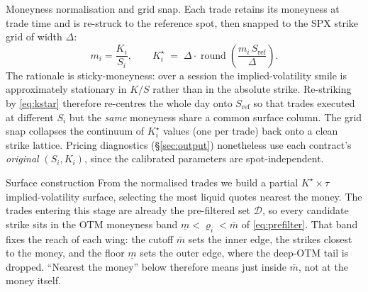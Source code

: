 \documentclass[a4paper, 11pt, reqno]{amsart}
\makeatletter
\def\section{\@startsection{section}{1}%
	\z@{.7\linespacing\@plus\linespacing}{.5\linespacing}%
	{\normalfont\bfseries\centering}}
\def\paragraph{\@startsection{paragraph}{4}%
	\z@\z@{-\fontdimen2\font}%
	{\normalfont\bfseries}}
\DeclareMathOperator{\round}{round}
\newcommand{\ConstOtmFloorSym}{\underline{m}}            \newcommand{\ConstOtmFloorVal}{0.6}
\newcommand{\ConstOtmCutoffSym}{\bar m}                  \newcommand{\ConstOtmCutoffVal}{0.98}
\newcommand{\ConstStrikeGridSym}{\Delta}                 \newcommand{\ConstStrikeGridVal}{5.0}
\makeatother
\begin{document}
		\paragraph{Moneyness normalisation and grid snap.} Each trade retains its moneyness at
		trade time and is re-struck to the reference spot, then snapped to the SPX strike grid of
		width $\ConstStrikeGridSym$:
		\begin{equation}\label{eq:kstar}
			m_i = \frac{K_i}{S_i},
			\qquad
			K^\star_i \;=\; \ConstStrikeGridSym \cdot \round\!\left( \frac{m_i\, S_{\mathrm{ref}}}{\ConstStrikeGridSym} \right).
		\end{equation}
		The rationale is sticky-moneyness: over a session the implied-volatility smile is
		approximately stationary in $K/S$ rather than in the absolute strike. Re-striking by
		\eqref{eq:kstar} therefore re-centres the whole day onto $S_{\mathrm{ref}}$ so that trades
		executed at different $S_i$ but the \emph{same} moneyness share a common surface column.
		The grid snap collapses the continuum of $K^\star_i$ values (one per trade) back onto a
		clean strike lattice. Pricing diagnostics (\S\ref{sec:output}) nonetheless use each
		contract's \emph{original} $(S_i,K_i)$, since the calibrated parameters are spot-independent.
		
	\section{Surface construction}\label{sec:surface}
		From the normalised trades we build a partial $K^\star \times \tau$ implied-volatility
		surface, selecting the most liquid quotes nearest the money. The trades entering this stage
		are already the pre-filtered set $\mathcal{D}$, so every candidate strike sits in the OTM
		moneyness band $\ConstOtmFloorSym < \varrho_i < \ConstOtmCutoffSym$ of \eqref{eq:prefilter}. That band fixes
		the reach of each wing: the cutoff $\ConstOtmCutoffSym$ sets the inner edge, the strikes closest to the
		money, and the floor $\ConstOtmFloorSym$ sets the outer edge, where the deep-OTM tail is dropped.
		``Nearest the money'' below therefore means just inside $\ConstOtmCutoffSym$, not at the money itself.
		
\end{document}
